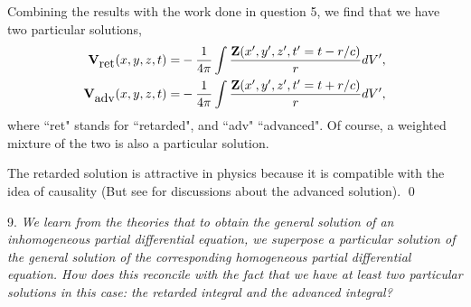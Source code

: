 \documentclass[11pt]{article}              %
\begin{document}

Combining the results with the work done in question 5, we find that we have two particular solutions, 
\begin{align}
		{\mathbf V}_{\mbox{ret}}(x,y,z,t)
		=&-\frac{1}{4\pi}\int \frac{{\mathbf Z}(x^\prime,y^\prime,z^\prime,t^\prime=t-r/c)}{r}dV^\prime,\notag\\
		{\mathbf V}_{\mbox{adv}}(x,y,z,t)
		=&-\frac{1}{4\pi}\int \frac{{\mathbf Z}(x^\prime,y^\prime,z^\prime,t^\prime=t+r/c)}{r}dV^\prime,\label{eqn:advsolution}
\end{align}
where ``ret" stands for ``retarded", and ``adv" ``advanced". Of course, a weighted mixture of the two is also a particular solution. 

The retarded solution is attractive in physics because it is compatible with the idea of causality (But see \cite{wheeler1945interaction} for discussions about the advanced solution).
\qed

9. {\it We learn from the theories that to obtain the general solution of an inhomogeneous partial differential equation, we superpose a particular solution of the general solution of the corresponding homogeneous partial differential equation. How does this reconcile with the fact that we have at least two particular solutions in this case: the retarded integral and the advanced integral?} 

\end{document}
